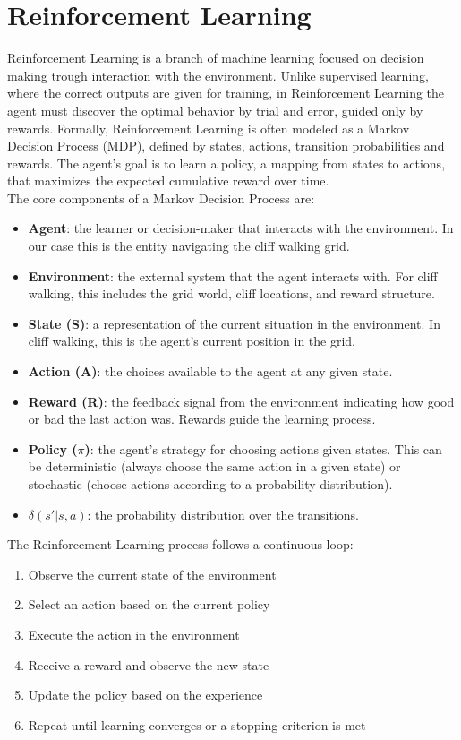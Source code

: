 \documentclass[a4paper,12pt]{article}
\begin{document}
\section{Reinforcement Learning}
Reinforcement Learning is a branch of machine learning focused on decision making trough interaction with the environment. Unlike supervised learning, where the correct outputs are given for training, in Reinforcement Learning the agent must discover the optimal behavior by trial and error, guided only by rewards. Formally, Reinforcement Learning is often modeled as a Markov Decision Process (MDP), defined by states, actions, transition probabilities and rewards. The agent's goal is to learn a policy, a mapping from states to actions, that maximizes the expected cumulative reward over time.
\vspace{0,5cm}\\
The core components of a Markov Decision Process are:
\begin{itemize}
    \item \textbf{Agent}: the learner or decision-maker that interacts with the environment. In our case this is the entity navigating the cliff walking grid.
    \item \textbf{Environment}: the external system that the agent interacts with. For cliff walking, this includes the grid world, cliff locations, and reward structure.
    \item \textbf{State (S)}: a representation of the current situation in the environment. In cliff walking, this is the agent's current position in the grid.
    \item \textbf{Action (A)}: the choices available to the agent at any given state.
    \item \textbf{Reward (R)}: the feedback signal from the environment indicating how good or bad the last action was. Rewards guide the learning process.
    \item \textbf{Policy ($\pi$)}: the agent's strategy for choosing actions given states. This can be deterministic (always choose the same action in a given state) or stochastic (choose actions according to a probability distribution).
    \item $\delta(s'|s,a)$: the probability distribution over the transitions.
\end{itemize}
The Reinforcement Learning process follows a continuous loop:
\begin{enumerate}
    \item Observe the current state of the environment
    \item Select an action based on the current policy
    \item Execute the action in the environment
    \item Receive a reward and observe the new state
    \item Update the policy based on the experience
    \item Repeat until learning converges or a stopping criterion is met
\end{enumerate}
\end{document}
